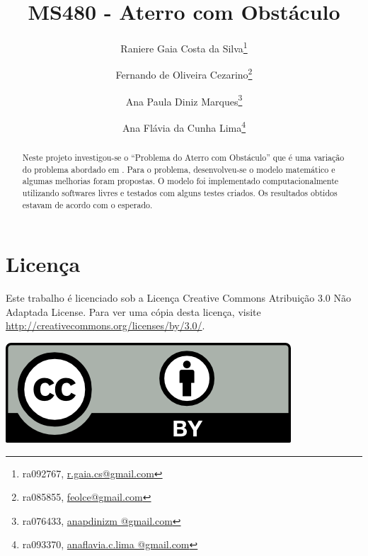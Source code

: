 \documentclass[12pt,a4paper]{article}
\begin{document}
\title{MS480 - Aterro com Obst\'{a}culo}
\author{Raniere Gaia Costa da Silva\footnote{ra092767,
\url{r.gaia.cs@gmail.com}} \and Fernando de Oliveira Cezarino\footnote{ra085855,
\url{feolce@gmail.com}} \and Ana Paula Diniz Marques\footnote{ra076433,
\url{anapdinizm @gmail.com}} \and  Ana Flávia da Cunha Lima\footnote{ra093370,
\url{anaflavia.c.lima @gmail.com}}}
\maketitle
\begin{abstract}
    Neste projeto investigou-se o ``Problema do Aterro com Obstáculo'' que é uma
    variação do problema abordado em \cite{Andjel:1989:TP}. Para o problema,
    desenvolveu-se o modelo matemático e algumas melhorias foram propostas.
    O modelo foi implementado computacionalmente utilizando softwares livres e
    testados com alguns testes criados. Os resultados obtidos estavam de acordo
    com o esperado.
\end{abstract}
\section*{Licen\c{c}a}
Este trabalho \'{e} licenciado sob a Licen\c{c}a Creative Commons
Atribui\c{c}\~{a}o 3.0 N\~{a}o Adaptada License. Para ver uma c\'{o}pia desta
licen\c{c}a, visite \url{http://creativecommons.org/licenses/by/3.0/}.
\begin{center}
    \includegraphics{../figuras/cc-by.png}
\end{center}
\newpage
\tableofcontents
\newpage







\appendix



%






\end{document}
